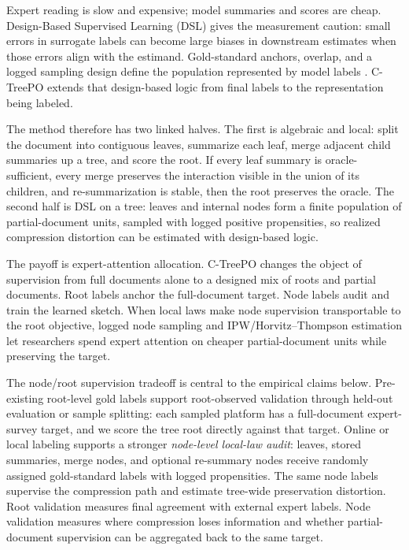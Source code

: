 Expert reading is slow and expensive; model summaries and scores are cheap.
Design-Based Supervised Learning (DSL) gives the measurement caution: small
errors in surrogate labels can become large biases in downstream estimates
when those errors align with the estimand. Gold-standard anchors, overlap, and
a logged sampling design define the population represented by model labels
\citep{EgamiEtAl2024}. C-TreePO extends that design-based logic from final
labels to the representation being labeled.

The method therefore has two linked halves. The first is algebraic and local:
split the document into contiguous leaves, summarize each leaf, merge adjacent
child summaries up a tree, and score the root. If every leaf summary is
oracle-sufficient, every merge preserves the interaction visible in the union
of its children, and re-summarization is stable, then the root preserves the
oracle. The second half is DSL on a tree: leaves and internal nodes form a
finite population of partial-document units, sampled with logged positive
propensities, so realized compression distortion can be estimated with
design-based logic.

The payoff is expert-attention allocation. C-TreePO changes the object of
supervision from full documents alone to a designed mix of roots and partial
documents. Root labels anchor the full-document target. Node labels audit and
train the learned sketch. When local laws make node supervision transportable
to the root objective, logged node sampling and IPW/Horvitz--Thompson
estimation let researchers spend expert attention on cheaper
partial-document units while preserving the target.

The node/root supervision tradeoff is central to the empirical claims below.
Pre-existing root-level gold labels support root-observed validation through
held-out evaluation or sample splitting: each sampled platform has a
full-document expert-survey target, and we score the tree root directly
against that target. Online or local labeling supports a stronger
\emph{node-level local-law audit}: leaves, stored summaries, merge nodes, and
optional re-summary nodes receive randomly assigned gold-standard labels with
logged propensities. The same node labels supervise the compression path and
estimate tree-wide preservation distortion. Root validation measures final
agreement with external expert labels. Node validation measures where
compression loses information and whether partial-document supervision can be
aggregated back to the same target.

